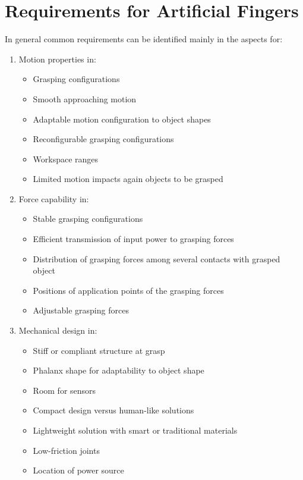 \documentclass[a4paper, 10pt, conference]{ieeeconf}      %
\begin{document}
\section{\textbf{Requirements for Artificial Fingers}}
In general common requirements can be identified mainly in the aspects for:\\
\begin{enumerate}
  \item Motion properties in:
  	\begin{itemize}
  		\item Grasping configurations
  		\item Smooth approaching motion
		\item Adaptable motion configuration to object shapes
		\item Reconfigurable grasping configurations
		\item Workspace ranges
		\item Limited motion impacts again objects to be grasped
	\end{itemize}
  \item Force capability in:
  	\begin{itemize}
  		\item Stable grasping configurations
		\item Efficient transmission of input power to grasping forces
		\item Distribution of grasping forces among several contacts with grasped object
		\item Positions of application points of the grasping forces
		\item Adjustable grasping forces
  	\end{itemize}
  \item Mechanical design in:
  	\begin{itemize}
  		\item Stiff or compliant structure at grasp
		\item Phalanx shape for adaptability to object shape
		\item Room for sensors
		\item Compact design versus human-like solutions
		\item Lightweight solution with smart or traditional materials
		\item Low-friction joints
		\item Location of power source\\
  	\end{itemize}
\end{enumerate}
\end{document}
